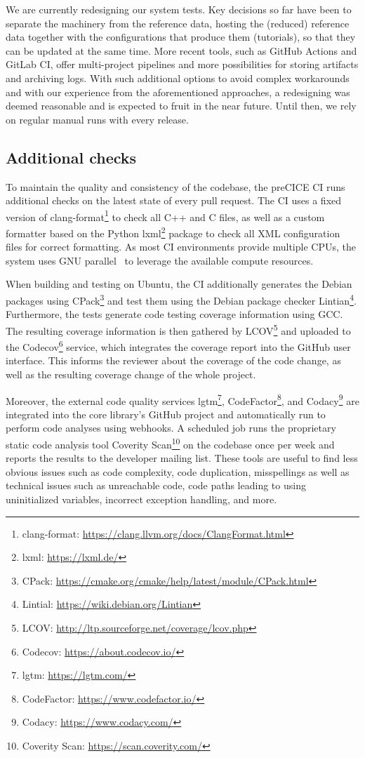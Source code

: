We are currently redesigning our system tests. Key decisions so far have been to separate the machinery from the reference data, hosting the (reduced) reference data together with the configurations that produce them (tutorials), so that they can be updated at the same time. More recent tools, such as GitHub Actions and GitLab CI, offer multi-project pipelines and more possibilities for storing artifacts and archiving logs. With such additional options to avoid complex workarounds and with our experience from the aforementioned approaches, a redesigning was deemed reasonable and is expected to fruit in the near future. Until then, we rely on regular manual runs with every release.

\subsection{Additional checks} 
\label{ssec:additional_checks}

To maintain the quality and consistency of the codebase, the preCICE CI runs additional checks on the latest state of every pull request.
The CI uses a fixed version of clang-format\footnote{clang-format: \url{https://clang.llvm.org/docs/ClangFormat.html}} to check all C++ and C files, as well as a custom formatter based on the Python lxml\footnote{lxml: \url{https://lxml.de/}} package to check all XML configuration files for correct formatting.
As most CI environments provide multiple CPUs, the system uses GNU parallel~\cite{gnuparallel} to leverage the available compute resources.

When building and testing on Ubuntu, the CI additionally generates the Debian packages using CPack\footnote{CPack: \url{https://cmake.org/cmake/help/latest/module/CPack.html}} and test them using the Debian package checker Lintian\footnote{Lintial: \url{https://wiki.debian.org/Lintian}}.
Furthermore, the tests generate code testing coverage information using GCC.
The resulting coverage information is then gathered by LCOV\footnote{LCOV: \url{http://ltp.sourceforge.net/coverage/lcov.php}} and uploaded to the Codecov\footnote{Codecov: \url{https://about.codecov.io/}} service, which integrates the coverage report into the GitHub user interface.
This informs the reviewer about the coverage of the code change, as well as the resulting coverage change of the whole project.

Moreover, the external code quality services lgtm\footnote{lgtm: \url{https://lgtm.com/}}, CodeFactor\footnote{CodeFactor: \url{https://www.codefactor.io/}}, and Codacy\footnote{Codacy: \url{https://www.codacy.com/}} are integrated into the core library's GitHub project and automatically run to perform code analyses using webhooks.
A scheduled job runs the proprietary static code analysis tool Coverity Scan\footnote{Coverity Scan: \url{https://scan.coverity.com/}} on the codebase once per week and reports the results to the developer mailing list.
These tools are useful to find less obvious issues such as code complexity, code duplication, misspellings as well as technical issues such as unreachable code, code paths leading to using uninitialized variables, incorrect exception handling, and more.

